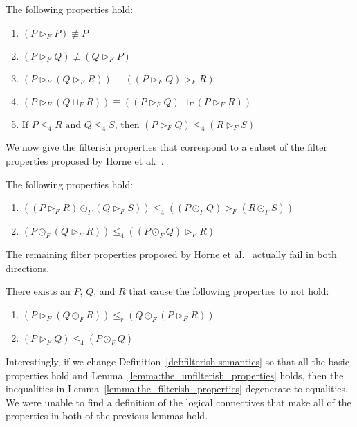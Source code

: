 \begin{lemma}
  \label{lemma:basic_properties_for_parallel}
  The following properties hold:
  \begin{enumerate}
  \item $(P \rhd_F P) \not\equiv P$\\[-5px]
  \item $(P \rhd_F Q) \not\equiv (Q \rhd_F P)$\\[-5px]
  \item $(P \rhd_F (Q \rhd_F R)) \equiv ((P \rhd_F Q) \rhd_F R)$\\[-5px]
  \item $(P \rhd_F (Q \sqcup_F R)) \equiv ((P \rhd_F Q) \sqcup_F (P \rhd_F R))$\\[-5px]
  \item $\text{If }P \leq_4 R \text{ and } Q \leq_4 S \text{, then } (P \rhd_F Q) \leq_4 (R \rhd_F S)$
  \end{enumerate}
\end{lemma}
We now give the filterish properties that correspond to a subset of
the filter properties proposed by Horne et
al.~\cite{horne2017semantics}.
\begin{lemma}
  \label{lemma:the_filterish_properties}
  The following properties hold:
  \begin{enumerate}
  \item $((P \rhd_F R) \odot_F (Q \rhd_F S)) \leq_4 ((P \odot_F Q) \rhd_F (R \odot_F S))$\\[-5px]
  \item $(P \odot_F (Q \rhd_F R)) \leq_4 ((P \odot_F Q) \rhd_F R)$
  \end{enumerate}
\end{lemma}
The remaining filter properties proposed by Horne et
al.~\cite{horne2017semantics} actually fail in both directions.
\begin{lemma}
  \label{lemma:the_unfilterish_properties}
  There exists an $P$, $Q$, and $R$ that cause the following
  properties to not hold:
  \begin{enumerate}
  \item $(P \rhd_F (Q \odot_F R)) \leq_r (Q \odot_F (P \rhd_F R))$\\[-5px]
  \item $(P \rhd_F Q) \leq_4 (P \odot_F Q)$
  \end{enumerate}
\end{lemma}
Interestingly, if we change Definition~\ref{def:filterish-semantics}
so that all the basic properties hold and
Lemma~\ref{lemma:the_unfilterish_properties} holds, then the
inequalities in Lemma~\ref{lemma:the_filterish_properties} degenerate
to equalities.  We were unable to find a definition of the logical
connectives that make all of the properties in both of the previous
lemmas hold.

